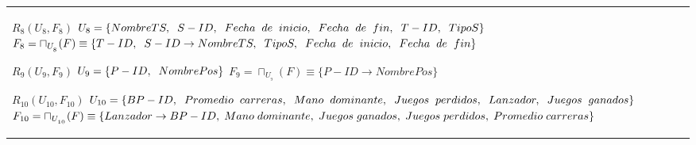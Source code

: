 \documentclass{report}
\begin{document}
\begin{tabularx}{\textwidth}{|X|}
        $ R_{8} ( U_{8} , F_{8} ) $ \newline 
        $ U_{8} = \{{NombreTS, \hspace{0.2cm}  S-ID, \hspace{0.2cm}  Fecha \hspace{0.2cm} de \hspace{0.2cm} inicio, \hspace{0.2cm}  Fecha \hspace{0.2cm} de \hspace{0.2cm} fin, \hspace{0.2cm}  T-ID, \hspace{0.2cm}  TipoS}\} $ \newline 
        $ F_{8} = \sqcap_{U_{_{8}}}(F) \equiv \{T-ID, \hspace{0.2cm} S-ID \rightarrow NombreTS, \hspace{0.2cm} TipoS, \hspace{0.2cm} Fecha \hspace{0.2cm} de \hspace{0.2cm} inicio, \hspace{0.2cm} Fecha \hspace{0.2cm} de \hspace{0.2cm} fin \} $\newline 
        
        $ R_{9} ( U_{9} , F_{9} ) $ \newline 
        $ U_{9} = \{{P-ID, \hspace{0.2cm}  NombrePos}\} $ \newline 
        $ F_{9} = \sqcap_{U_{_{9}}}(F) \equiv \{P-ID \rightarrow NombrePos \} $\newline 
        
        $ R_{10} ( U_{10} , F_{10} ) $ \newline 
        $ U_{10} = \{{BP-ID, \hspace{0.2cm}  Promedio \hspace{0.2cm} carreras, \hspace{0.2cm}  Mano \hspace{0.2cm} dominante, \hspace{0.2cm} Juegos \hspace{0.2cm} perdidos, \hspace{0.2cm}  Lanzador, \hspace{0.2cm} Juegos \hspace{0.2cm} ganados}\} $ \newline 
        $ F_{10} = \sqcap_{U_{_{10}}}(F) \equiv \{Lanzador \rightarrow BP-ID, \hspace{0.1cm} Mano \hspace{0.1cm} dominante, \hspace{0.1cm} Juegos \hspace{0.1cm} ganados, \hspace{0.1cm} Juegos \hspace{0.1cm} perdidos, \hspace{0.1cm} Promedio \hspace{0.1cm} carreras \} $\newline \\
        

\end{tabularx}
\end{document}
